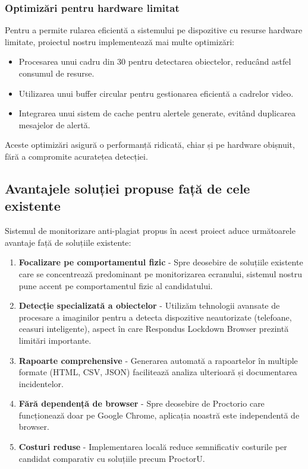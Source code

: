 \documentclass[12pt,a4paper]{article}
\begin{document}
\subsubsection{Optimizări pentru hardware limitat}
Pentru a permite rularea eficientă a sistemului pe dispozitive cu resurse hardware limitate, proiectul nostru implementează mai multe optimizări:
\begin{itemize}
    \item Procesarea unui cadru din 30 pentru detectarea obiectelor, reducând astfel consumul de resurse.
    \item Utilizarea unui buffer circular pentru gestionarea eficientă a cadrelor video.
    \item Integrarea unui sistem de cache pentru alertele generate, evitând duplicarea mesajelor de alertă.
\end{itemize}
Aceste optimizări asigură o performanță ridicată, chiar și pe hardware obișnuit, fără a compromite acuratețea detecției.

\subsection{Avantajele soluției propuse față de cele existente}

Sistemul de monitorizare anti-plagiat propus în acest proiect aduce următoarele avantaje față de soluțiile existente:

\begin{enumerate}
    \item \textbf{Focalizare pe comportamentul fizic} - Spre deosebire de soluțiile existente care se concentrează predominant pe monitorizarea ecranului, sistemul nostru pune accent pe comportamentul fizic al candidatului.
    
    \item \textbf{Detecție specializată a obiectelor} - Utilizăm tehnologii avansate de procesare a imaginilor pentru a detecta dispozitive neautorizate (telefoane, ceasuri inteligente), aspect în care Respondus Lockdown Browser prezintă limitări importante.
    
    \item \textbf{Rapoarte comprehensive} - Generarea automată a rapoartelor în multiple formate (HTML, CSV, JSON) facilitează analiza ulterioară și documentarea incidentelor.
    
    \item \textbf{Fără dependență de browser} - Spre deosebire de Proctorio care funcționează doar pe Google Chrome, aplicația noastră este independentă de browser.
    
    \item \textbf{Costuri reduse} - Implementarea locală reduce semnificativ costurile per candidat comparativ cu soluțiile precum ProctorU.
\end{enumerate}
\end{document}
